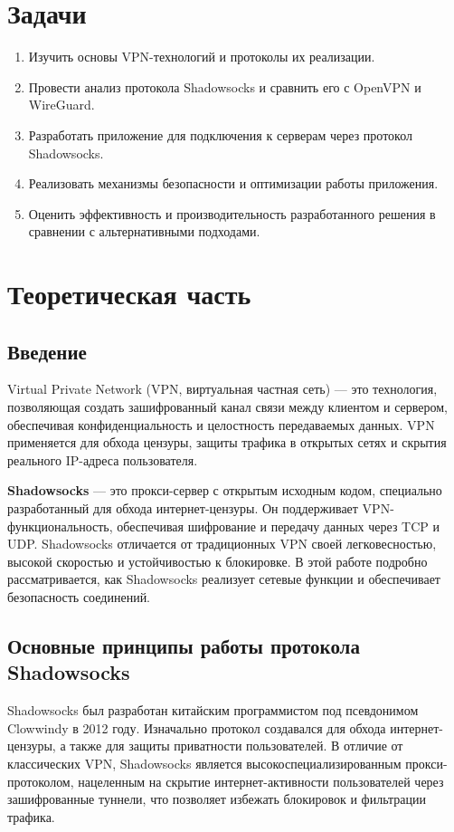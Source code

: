 \documentclass{SCWorks}
\begin{document}
\section*{Задачи}
\begin{enumerate}
    \item Изучить основы VPN-технологий и протоколы их реализации.
    \item Провести анализ протокола Shadowsocks и сравнить его с OpenVPN и WireGuard.
    \item Разработать приложение для подключения к серверам через протокол Shadowsocks.
    \item Реализовать механизмы безопасности и оптимизации работы приложения.
    \item Оценить эффективность и производительность разработанного решения в сравнении с альтернативными подходами.
\end{enumerate}


\section{Теоретическая часть}

\subsection{Введение}
Virtual Private Network (VPN, виртуальная частная сеть) — это технология, позволяющая создать зашифрованный канал связи между клиентом и сервером, обеспечивая конфиденциальность и целостность передаваемых данных. VPN применяется для обхода цензуры, защиты трафика в открытых сетях и скрытия реального IP-адреса пользователя.

\textbf{Shadowsocks} — это прокси-сервер с открытым исходным кодом, специально разработанный для обхода интернет-цензуры. Он поддерживает VPN-функциональность, обеспечивая шифрование и передачу данных через TCP и UDP. Shadowsocks отличается от традиционных VPN своей легковесностью, высокой скоростью и устойчивостью к блокировке. В этой работе подробно рассматривается, как Shadowsocks реализует сетевые функции и обеспечивает безопасность соединений.

\subsection{Основные принципы работы протокола Shadowsocks}

\textbf{}Shadowsocks был разработан китайским программистом под псевдонимом Clowwindy в 2012 году. Изначально протокол создавался для обхода интернет-цензуры, а также для защиты приватности пользователей. В отличие от классических VPN, Shadowsocks является высокоспециализированным прокси-протоколом, нацеленным на скрытие интернет-активности пользователей через зашифрованные туннели, что позволяет избежать блокировок и фильтрации трафика.
\end{document}
